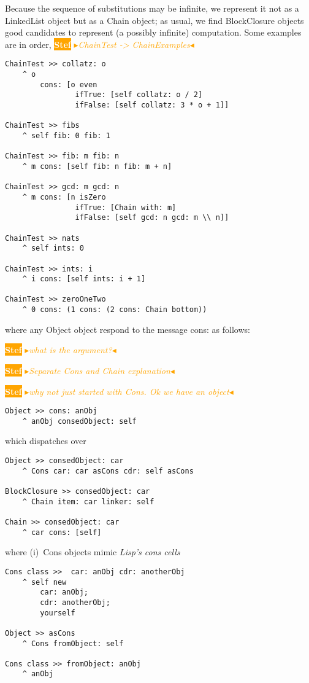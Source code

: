 \documentclass[a4paper,11pt]{article}
\newcommand{\nb}[3]{
		{\colorbox{#2}{\bfseries\sffamily\scriptsize\textcolor{white}{#1}}}
		{\textcolor{#2}{\sf\small$\blacktriangleright$\textit{#3}$\blacktriangleleft$}}}
\newcommand{\nb}[3]{}
\newcommand{\sd}[1]{\nb{Stef}{orange}{#1}}
\newcommand{\ct}[1]{{\textsf{#1}}\xspace}
\begin{document}
Because the sequence of substitutions may be infinite, we
represent it not as a \ct{LinkedList} object but as a \ct{Chain} object;
as usual, we find \ct{BlockClosure} objects good candidates to represent (a possibly
infinite) computation. Some examples are in order, \sd{ChainTest -> ChainExamples}
\begin{verbatim}
ChainTest >> collatz: o
    ^ o
        cons: [o even
                ifTrue: [self collatz: o / 2]
                ifFalse: [self collatz: 3 * o + 1]]

ChainTest >> fibs
    ^ self fib: 0 fib: 1

ChainTest >> fib: m fib: n
    ^ m cons: [self fib: n fib: m + n]

ChainTest >> gcd: m gcd: n
    ^ m cons: [n isZero
                ifTrue: [Chain with: m]
                ifFalse: [self gcd: n gcd: m \\ n]]

ChainTest >> nats
    ^ self ints: 0

ChainTest >> ints: i
    ^ i cons: [self ints: i + 1]

ChainTest >> zeroOneTwo
    ^ 0 cons: (1 cons: (2 cons: Chain bottom))
\end{verbatim}
where any \ct{Object} object respond to the message \ct{cons:} as follows: 
\sd{what is the argument?}
\sd{Separate Cons and Chain explanation}
\sd{why not just started with Cons. Ok we have an object}
\begin{verbatim}
Object >> cons: anObj
    ^ anObj consedObject: self
\end{verbatim}
which dispatches over
\begin{verbatim}
Object >> consedObject: car
    ^ Cons car: car asCons cdr: self asCons

BlockClosure >> consedObject: car
    ^ Chain item: car linker: self

Chain >> consedObject: car
    ^ car cons: [self]
\end{verbatim}
where (i)~\ct{Cons} objects mimic \textit{Lisp's cons cells}
\begin{verbatim}
Cons class >>  car: anObj cdr: anotherObj
    ^ self new
        car: anObj;
        cdr: anotherObj;
        yourself

Object >> asCons
    ^ Cons fromObject: self

Cons class >> fromObject: anObj
    ^ anObj
\end{verbatim}
\end{document}
